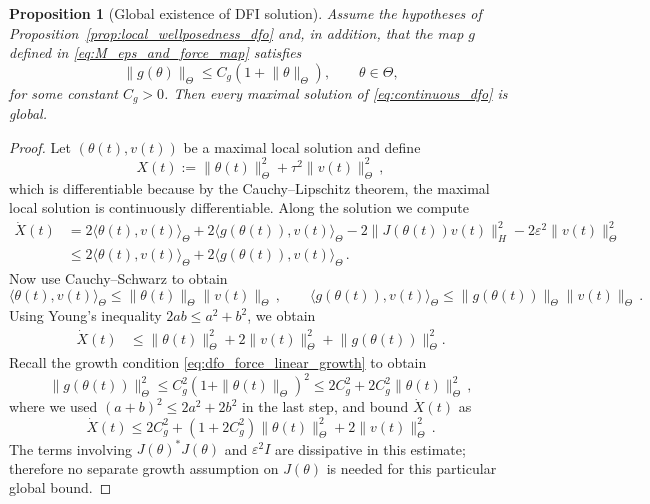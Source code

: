 \documentclass[oneside,11pt]{article}
\newtheorem{proposition}{Proposition}
\theoremstyle{remark}
\theoremstyle{thmstyleone}
\theoremstyle{thmstylethree}
\theoremstyle{thmstyletwo}
\newcommand{\ip}[2]{\langle #1,#2\rangle}
\newcommand{\norm}[1]{\lVert #1\rVert}
\begin{document}
 \begin{proposition}[Global existence of DFI solution]
          \label{prop:global_existence_dfo}
          Assume the hypotheses of Proposition~\ref{prop:local_wellposedness_dfo} and, in addition, that the map $g$ defined in \eqref{eq:M_eps_and_force_map} satisfies
          \begin{equation}
            \norm{g(\theta)}_\Theta\le C_g(1+\norm{\theta}_\Theta),
            \qquad \theta\in \Theta,
            \label{eq:dfo_force_linear_growth}
          \end{equation}
          for some constant $C_g>0$.
          Then every maximal solution of \eqref{eq:continuous_dfo} is global.
        \end{proposition}
 \begin{proof}
          Let $(\theta(t),v(t))$ be a maximal local solution and define
          \begin{equation}\label{eq:ProofGlobalExsist:XDef}
            X(t):=\norm{\theta(t)}_\Theta^2+\tau^2\norm{v(t)}_\Theta^2\,,
          \end{equation}
          which is differentiable because by the Cauchy--Lipschitz theorem, the maximal local solution is continuously differentiable. 
          Along the solution we compute
          \begin{align*}
            \dot X(t)
             & =
            2\ip{\theta(t)}{v(t)}_\Theta
            +2\ip{g(\theta(t))}{v(t)}_\Theta
            -2\norm{J(\theta(t))v(t)}_H^2
            -2\varepsilon^2\norm{v(t)}_\Theta^2                                          \\
             & \leq  2\ip{\theta(t)}{v(t)}_\Theta
            +2\ip{g(\theta(t))}{v(t)}_{\Theta}\,.
            \end{align*}
            Now use Cauchy--Schwarz to obtain
            \[
            \langle \theta(t), v(t)\rangle_{\Theta} \leq \|\theta(t)\|_{\Theta}\|v(t)\|_{\Theta}\,,\qquad \langle g(\theta(t)), v(t)\rangle_{\Theta} \leq \|g(\theta(t))\|_{\Theta}\|v(t)\|_{\Theta}\,.
            \]
            Using Young's inequality $2ab \leq a^2 + b^2$, we obtain
            \begin{align*}
            \dot{X}(t)  & \leq \norm{\theta(t)}_\Theta^2+2\norm{v(t)}_\Theta^2+\norm{g(\theta(t))}_\Theta^2. 
            \end{align*}
            Recall the growth condition \eqref{eq:dfo_force_linear_growth} to obtain
            \[
            \|g(\theta(t))\|_{\Theta}^2 \leq C_g^2(1 + \|\theta(t)\|_{\Theta})^2 \leq 2C_g^2 + 2C_g^2\|\theta(t)\|_{\Theta}^2\,,
            \]
            where we used $(a + b)^2 \leq 2a^2 + 2b^2$ in the last step, and bound $\dot{X}(t)$ as
            \begin{equation}\label{eq:GlobalExtProof:HelperA}
            \dot{X}(t) \leq 2C_g^2 + (1 + 2C_g^2)\|\theta(t)\|_{\Theta}^2 + 2\|v(t)\|_{\Theta}^2\,.
            \end{equation}
            The terms involving $J(\theta)^*J(\theta)$ and $\varepsilon^2 I$ are dissipative in this estimate; therefore no separate growth assumption on $J(\theta)$ is needed for this particular global bound. 
            

\end{proof}
\end{document}
